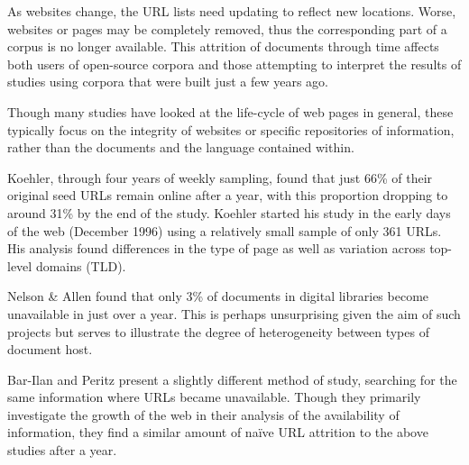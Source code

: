 As websites change, the URL lists need updating to reflect new locations. 
Worse, websites or pages may be completely removed, thus the corresponding part of a corpus is no longer available.
This attrition of documents through time affects both users of open-source corpora 
and those attempting to interpret the results of studies using corpora that were built just a few years ago.

Though many studies have looked at the life-cycle of web pages in general, these typically focus on the integrity of websites or specific repositories of information, rather than the documents and the language contained within.



Koehler\cite{koehler2002web,koehler2004longitudinal}, through four years of weekly sampling, found that just 66\% of their original seed URLs remain online after a year, with this proportion dropping to around 31\% by the end of the study.  Koehler started his study in the early days of the web (December 1996) using a relatively small sample of only 361 URLs.  His analysis found differences in the type of page as well as variation across top-level domains (TLD). %

Nelson \& Allen\cite{nelson2002object} found that only 3\% of documents in digital libraries become unavailable in just over a year. This is perhaps unsurprising given the aim of such projects but serves to illustrate the degree of heterogeneity between types of document host.  

Bar-Ilan and Peritz\cite{bar1999life} present a slightly different method of study, searching for the same information where URLs became unavailable.  Though they primarily investigate the growth of the web in their analysis of the availability of information, they find a similar amount of na\"{i}ve URL attrition to the above studies after a year.  




